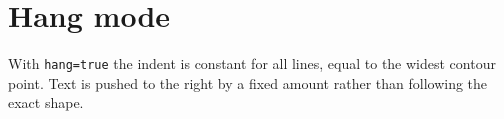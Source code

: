\documentclass{article}
\begin{document}
\section*{Hang mode}

With \texttt{hang=true} the indent is constant for all lines,
equal to the widest contour point. Text is pushed to the right
by a fixed amount rather than following the exact shape.

\lipsum[1-7]
\end{document}
